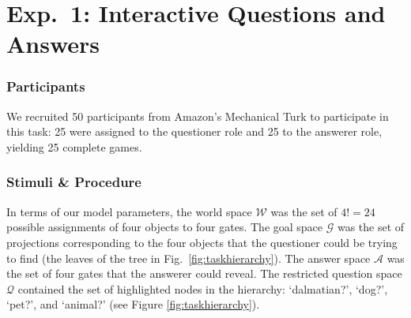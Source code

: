 \documentclass[12pt, floatsintext, jou]{apa6}
\begin{document}
\section{Exp.~1: Interactive Questions and Answers}


\subsubsection{Participants} We recruited 50 participants
from Amazon's Mechanical Turk to participate in this task: 25 were assigned to the  questioner role and 25 to the answerer role, yielding 25 complete games.

\subsubsection{Stimuli \& Procedure} In terms of our model parameters, the world space $\mathcal{W}$ was the set of $4! = 24$ possible assignments of four objects to four gates. The goal space $\mathcal{G}$ was the set of projections corresponding to the four objects that the questioner could be trying to find (the leaves of the tree in Fig.~\ref{fig:taskhierarchy}). The answer space $\mathcal{A}$ was the set of four gates that the answerer could  reveal. The restricted question space $\mathcal{Q}$ contained the set of highlighted nodes in the hierarchy: `dalmatian?', `dog?', `pet?', and `animal?' (see Figure \ref{fig:taskhierarchy}). 
\end{document}
